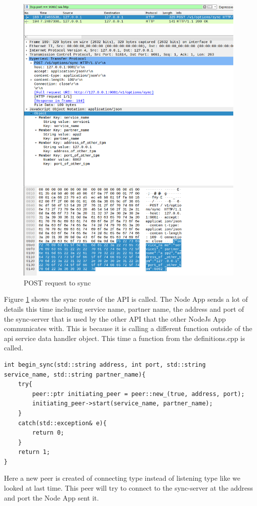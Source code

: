 \begin{figure}[!h]
  \centering
      \includegraphics[width=1\textwidth]{Figures/b9.png}
  \caption[POST request to sync]{POST request to sync}
  \label{fig:b9}
\end{figure}
\FloatBarrier
Figure \ref{fig:b9} shows the sync route of the API is called. The Node App sends a lot of details this time including service name, partner name, the address and port of the sync-server that is used by the other API that the other NodeJs App communicates with. This is because it is calling a different function outside of the api service data handler object. This time a function from the definitions.cpp is called.
\begin{lstlisting}
int begin_sync(std::string address, int port, std::string service_name, std::string partner_name){
    try{
        peer::ptr initiating_peer = peer::new_(true, address, port);
        initiating_peer->start(service_name, partner_name);
    }
    catch(std::exception& e){
        return 0;
    }
    return 1;
}
\end{lstlisting} 
Here a new peer is created of connecting type instead of listening type like we looked at last time. This peer will try to connect to the sync-server at the address and port the Node App sent it.


